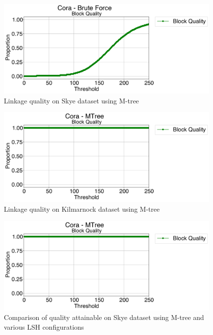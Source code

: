 \documentclass{llncs}
\begin{document}
\begin{figure}
\includegraphics[width=\textwidth]{figures/plotBQ_--_Cora_-_Brute_Force}
\caption{Linkage quality on Skye dataset using M-tree\label{skye-quality-mtree}}
\end{figure}

\begin{figure}
\includegraphics[width=\textwidth]{figures/plotBQ_--_Cora_-_MTree}
\caption{Linkage quality on Kilmarnock dataset using M-tree\label{kilmarnock-quality-mtree}}
\end{figure}

\begin{figure}
\includegraphics[width=\textwidth]{figures/plotBQ_--_Cora_-_MTree}
\caption{Comparison of quality attainable on Skye dataset using M-tree and various LSH configurations\label{mtree-lsh-quality}}
\end{figure}
\end{document}
